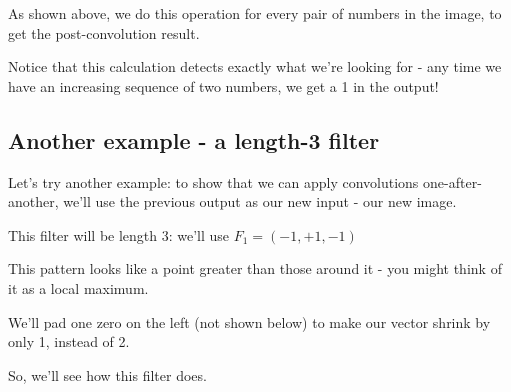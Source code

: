         
        As shown above, we do this operation for every pair of numbers in the image, to get the post-convolution result.
        
        Notice that this calculation detects exactly what we're looking for - any time we have an increasing sequence of two numbers, we get a 1 in the output!
        
        
        
        
        
    \subsection{Another example - a length-3 filter }
    
    Let's try another example: to show that we can apply convolutions one-after-another, we'll use the previous output as our new input - our new image.
    
    This filter will be length 3: we'll use $F_1 = (-1, +1, -1)$
    
    This pattern looks like a point greater than those around it - you might think of it as a local maximum.
    
    We'll pad one zero on the left (not shown below) to make our vector shrink by only 1, instead of 2.    
    
    So, we'll see how this filter does.
          
